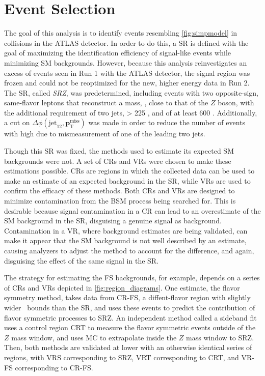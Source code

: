 
\chapter{Event Selection} %
\label{ch:eventsel} 

The goal of this analysis is to identify events resembling \autoref{fig:simpmodel} in collisions in the ATLAS detector. In order to do this, a \acf{SR} is defined with the goal of maximizing the identification efficiency of signal-like events while minimizing \ac{SM} backgrounds. However, because this analysis reinvestigates an excess of events seen in Run 1 with the ATLAS detector, the signal region was frozen and could not be reoptimized for the new, higher energy data in Run 2. The \ac{SR}, called \textit{SRZ}, was predetermined, including events with two opposite-sign, same-flavor leptons that reconstruct a mass, \mll, close to that of the $Z$ boson, with the additional requirement of two jets, \met > 225 \gev, and \HT of at least 600 \gev. Additionally, a cut on $\Delta\phi(\text{jet}_{12},{\boldsymbol p}_{\mathrm{T}}^{\mathrm{miss}})$ was made in order to reduce the number of events with high \met due to mismeasurement of one of the leading two jets. 

Though this \ac{SR} was fixed, the methods used to estimate its expected \ac{SM} backgrounds were not. A set of \acfp{CR} and \acfp{VR} were chosen to make these estimations possible. \acp{CR} are regions in which the collected data can be used to make an estimate of an expected background in the \ac{SR}, while \acp{VR} are used to confirm the efficacy of these methods. Both \acp{CR} and \acp{VR} are designed to minimize contamination from the \ac{BSM} process being searched for. This is desirable because signal contamination in a \ac{CR} can lead to an overestimate of the \ac{SM} background in the \ac{SR}, disguising a genuine signal as background. Contamination in a \ac{VR}, where background estimates are being validated, can make it appear that the \ac{SM} background is not well described by an estimate, causing analyzers to adjust the method to account for the difference, and again, disguising the effect of the same signal in the \ac{SR}. 

The strategy for estimating the \ac{FS} backgrounds, for example, depends on a series of \acp{CR} and \acp{VR} depicted in \autoref{fig:region_diagrams}. One estimate, the flavor symmetry method, takes data from CR-FS, a diffent-flavor region with slightly wider \mll~bounds than the \ac{SR}, and uses these events to predict the contribution of flavor symmetric processes to SRZ. An independent method called a sideband fit uses a control region CRT to measure the flavor symmetric events outside of the $Z$ mass window, and uses \ac{MC} to extrapolate inside the $Z$ mass window to SRZ. Then, both methods are validated at lower \met with an otherwise identical series of regions, with VRS corresponding to SRZ, VRT corresponding to CRT, and VR-FS corresponding to CR-FS. 

